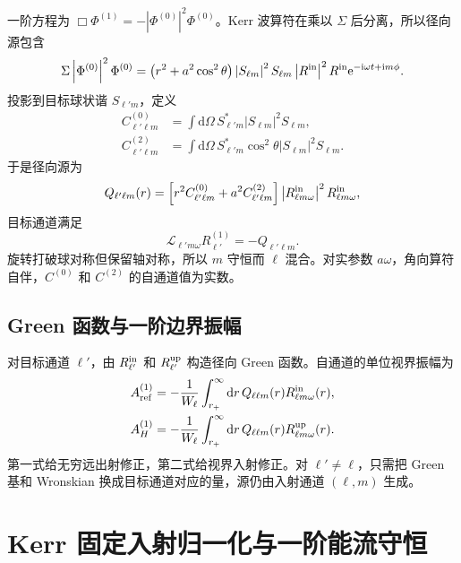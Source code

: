 \documentclass[UTF8,fontset=fandol,11pt,a4paper,oneside]{ctexart}
\numberwithin{equation}{section}
\newcommand{\dd}{\mathrm d}
\newcommand{\ii}{\mathrm i}
\newcommand{\ee}{\mathrm e}
\newcommand{\cL}{\mathcal L}
\newcommand{\rp}{r_+}
\newcommand{\Aref}{A_{\rm ref}^{(1)}}
\newcommand{\AH}{A_H^{(1)}}
\newcommand{\abs}[1]{\left|#1\right|}
\begin{document}
一阶方程为 $\Box\Phi^{(1)}=-\abs{\Phi^{(0)}}^2\Phi^{(0)}$。Kerr 波算符在乘以 $\Sigma$ 后分离，所以径向源包含
\begin{equation}
\Sigma\abs{\Phi^{(0)}}^2\Phi^{(0)}
=\left(r^2+a^2\cos^2\theta\right)
\abs{S_{\ell m}}^2S_{\ell m}
\abs{R^{\rm in}}^2R^{\rm in}
\ee^{-\ii\omega t+\ii m\phi}.
\end{equation}
投影到目标球状谐 $S_{\ell'm}$，定义
\begin{align}
C^{(0)}_{\ell'\ell m}
&=\int\dd\Omega\,S^*_{\ell'm}
\abs{S_{\ell m}}^2S_{\ell m},\label{eq:C0}\\
C^{(2)}_{\ell'\ell m}
&=\int\dd\Omega\,S^*_{\ell'm}\cos^2\theta
\abs{S_{\ell m}}^2S_{\ell m}.
\label{eq:C2}
\end{align}
于是径向源为
\begin{equation}
Q_{\ell'\ell m}(r)=
\left[r^2C^{(0)}_{\ell'\ell m}
+a^2C^{(2)}_{\ell'\ell m}\right]
\abs{R^{\rm in}_{\ell m\omega}}^2R^{\rm in}_{\ell m\omega},
\label{eq:Q}
\end{equation}
目标通道满足
\begin{equation}
\boxed{\cL_{\ell'm\omega}R^{(1)}_{\ell'}=-Q_{\ell'\ell m}.}
\label{eq:kerr-inhom}
\end{equation}
旋转打破球对称但保留轴对称，所以 $m$ 守恒而 $\ell$ 混合。对实参数 $a\omega$，角向算符自伴，$C^{(0)}$ 和 $C^{(2)}$ 的自通道值为实数。

\subsection{Green 函数与一阶边界振幅}

对目标通道 $\ell'$，由 $R^{\rm in}_{\ell'}$ 和 $R^{\rm up}_{\ell'}$ 构造径向 Green 函数。自通道的单位视界振幅为
\begin{align}
\Aref
&=-\frac{1}{W_\ell}
\int_{\rp}^{\infty}\dd r\,
Q_{\ell\ell m}(r)R^{\rm in}_{\ell m\omega}(r),
\label{eq:kerr-Aref}\\
\AH
&=-\frac{1}{W_\ell}
\int_{\rp}^{\infty}\dd r\,
Q_{\ell\ell m}(r)R^{\rm up}_{\ell m\omega}(r).
\label{eq:kerr-AH}
\end{align}
第一式给无穷远出射修正，第二式给视界入射修正。对 $\ell'\ne\ell$，只需把 Green 基和 Wronskian 换成目标通道对应的量，源仍由入射通道 $(\ell,\allowbreak m)$ 生成。

\section{Kerr 固定入射归一化与一阶能流守恒}
\label{sec:kerr-flux1}
\end{document}
